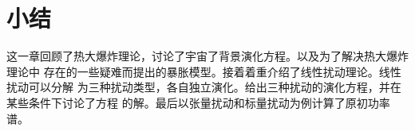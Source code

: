 \section{小结}

这一章回顾了热大爆炸理论，讨论了宇宙了背景演化方程。以及为了解决热大爆炸理论中
存在的一些疑难而提出的暴胀模型。接着着重介绍了线性扰动理论。线性扰动可以分解
为三种扰动类型，各自独立演化。给出三种扰动的演化方程，并在某些条件下讨论了方程
的解。最后以张量扰动和标量扰动为例计算了原初功率谱。
